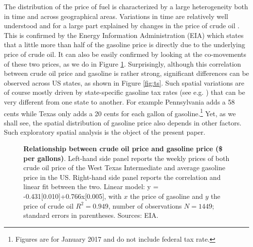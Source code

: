 \documentclass[10pt]{article}
\begin{document}
The distribution of the price of fuel is characterized by a large heterogeneity both in time and across geographical areas. Variations in time are relatively well understood and for a large part explained by changes in the price of crude oil \citep{borenstein1997gasoline}. This is confirmed by the Energy Information Administration (EIA) which states that a little more than half of the gasoline price is directly due to the underlying price of crude oil. It can also be easily confirmed by looking at the co-movements of these two prices, as we do in Figure \ref{fig:corr}. Surprisingly, although this correlation between crude oil price and gasoline is rather strong, significant differences can be observed across US states, as shown in Figure \ref{fig:ts}. 
Such spatial variations are of course mostly driven by state-specific gasoline tax rates (see e.g. \citealt{chouinard2004incidence}) that can be very different from one state to another. For example Pennsylvania adds a 58 cents while Texas only adds a 20 cents for each gallon of gasoline.\footnote{Figures are for January 2017 and do not include federal tax rate.} Yet, as we shall see, the spatial distribution of gasoline price also depends in other factors. Such exploratory spatial analysis is the object of the present paper.

\begin{figure}
\centering
\label{fig:1}
\caption{\textbf{Relationship between crude oil price and gasoline price (\$ per gallons)}. Left-hand side panel reports the weekly prices of both crude oil price of the West Texas Intermediate and average gasoline price in the US. Right-hand side panel reports the correlation and linear fit between the two. Linear model: y = -0.431[0.010]+0.766x[0.005], with $x$ the price of gasoline and $y$ the price of crude oil $R^2=0.949$, number of observations $N=1449$; standard errors in parentheses. Sources: EIA.}
\label{fig:corr}
\end{figure}
\end{document}
